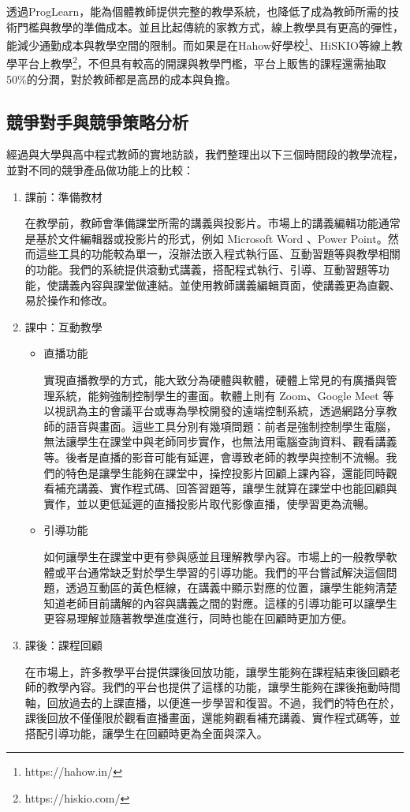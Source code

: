 \begin{enumerate}
  \par 透過ProgLearn，能為個體教師提供完整的教學系統，也降低了成為教師所需的技術門檻與教學的準備成本。並且比起傳統的家教方式，線上教學具有更高的彈性，能減少通勤成本與教學空間的限制。而如果是在Hahow好學校\footnote{https://hahow.in/}、HiSKIO等線上教學平台上教學\footnote{https://hiskio.com/}，不但具有較高的開課與教學門檻，平台上販售的課程還需抽取50\%的分潤，對於教師都是高昂的成本與負擔。
\end{enumerate}

\subsection{競爭對手與競爭策略分析}

經過與大學與高中程式教師的實地訪談，我們整理出以下三個時間段的教學流程，並對不同的競爭產品做功能上的比較：

\begin{enumerate}
  \setlength{\parindent}{2em}
  \item 課前：準備教材
    \par 在教學前，教師會準備課堂所需的講義與投影片。市場上的講義編輯功能通常是基於文件編輯器或投影片的形式，例如 Microsoft Word 、Power Point。然而這些工具的功能較為單一，沒辦法嵌入程式執行區、互動習題等與教學相關的功能。我們的系統提供滾動式講義，搭配程式執行、引導、互動習題等功能，使講義內容與課堂做連結。並使用教師講義編輯頁面，使講義更為直觀、易於操作和修改。
  \item 課中：互動教學
  \begin{itemize}
    \setlength{\parindent}{2em}
    \item 直播功能
      \par 實現直播教學的方式，能大致分為硬體與軟體，硬體上常見的有廣播與管理系統，能夠強制控制學生的畫面。軟體上則有 Zoom、Google Meet 等以視訊為主的會議平台或專為學校開發的遠端控制系統，透過網路分享教師的語音與畫面。這些工具分別有幾項問題：前者是強制控制學生電腦，無法讓學生在課堂中與老師同步實作，也無法用電腦查詢資料、觀看講義等。後者是直播的影音可能有延遲，會導致老師的教學與控制不流暢。我們的特色是讓學生能夠在課堂中，操控投影片回顧上課內容，還能同時觀看補充講義、實作程式碼、回答習題等，讓學生就算在課堂中也能回顧與實作，並以更低延遲的直播投影片取代影像直播，使學習更為流暢。
    \item 引導功能
      \par 如何讓學生在課堂中更有參與感並且理解教學內容。市場上的一般教學軟體或平台通常缺乏對於學生學習的引導功能。我們的平台嘗試解決這個問題，透過互動區的黃色框線，在講義中顯示對應的位置，讓學生能夠清楚知道老師目前講解的內容與講義之間的對應。這樣的引導功能可以讓學生更容易理解並隨著教學進度進行，同時也能在回顧時更加方便。
  \end{itemize}
  \item 課後：課程回顧
  \par 在市場上，許多教學平台提供課後回放功能，讓學生能夠在課程結束後回顧老師的教學內容。我們的平台也提供了這樣的功能，讓學生能夠在課後拖動時間軸，回放過去的上課直播，以便進一步學習和復習。不過，我們的特色在於，課後回放不僅僅限於觀看直播畫面，還能夠觀看補充講義、實作程式碼等，並搭配引導功能，讓學生在回顧時更為全面與深入。\\
\end{enumerate}

